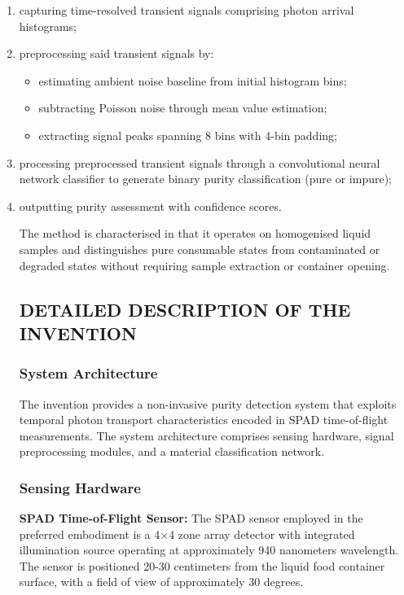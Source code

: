 \documentclass[11pt,a4paper]{article}
\begin{document}
\begin{enumerate}[leftmargin=*,label=\alph*)]
\item capturing time-resolved transient signals comprising photon arrival histograms;

\item preprocessing said transient signals by:
\begin{itemize}[leftmargin=*]
\item estimating ambient noise baseline from initial histogram bins;
\item subtracting Poisson noise through mean value estimation;
\item extracting signal peaks spanning 8 bins with 4-bin padding;
\end{itemize}

\item processing preprocessed transient signals through a convolutional neural network classifier to generate binary purity classification (pure or impure);

\item outputting purity assessment with confidence scores.

The method is characterised in that it operates on homogenised liquid samples and distinguishes pure consumable states from contaminated or degraded states without requiring sample extraction or container opening.

\vspace{0.5em}
\subsection{DETAILED DESCRIPTION OF THE INVENTION}

\subsubsection{System Architecture}

The invention provides a non-invasive purity detection system that exploits temporal photon transport characteristics encoded in SPAD time-of-flight measurements. The system architecture comprises sensing hardware, signal preprocessing modules, and a material classification network.

\subsubsection{Sensing Hardware}

\textbf{SPAD Time-of-Flight Sensor:}
The SPAD sensor employed in the preferred embodiment is a 4$\times$4 zone array detector with integrated illumination source operating at approximately 940 nanometers wavelength. The sensor is positioned 20-30 centimeters from the liquid food container surface, with a field of view of approximately 30 degrees.


\end{enumerate}
\end{document}
